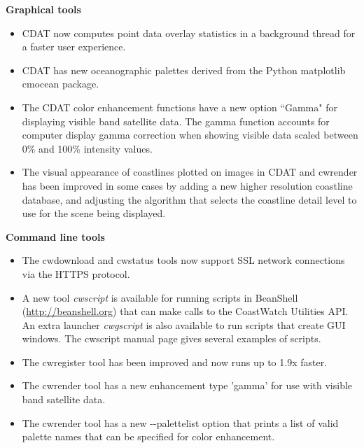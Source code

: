 \hspace{0.4cm} {\bf Graphical tools}
\begin{itemize}

  \item CDAT now computes point data overlay statistics in a background thread
  for a faster user experience.

  \item CDAT has new oceanographic palettes derived from the Python matplotlib
  cmocean package.

  \item The CDAT color enhancement functions have a new option ``Gamma" for
  displaying visible band satellite data.  The gamma function accounts for
  computer display gamma correction when showing visible data scaled between
  0\% and 100\% intensity values.

  \item The visual appearance of coastlines plotted on images in CDAT and
  cwrender has been improved in some cases by adding a new higher
  resolution coastline database, and adjusting the algorithm that selects
  the coastline detail level to use for the scene being displayed.

\end{itemize}

\hspace{0.4cm} {\bf Command line tools}
\begin{itemize}

    \item The cwdownload and cwstatus tools now support SSL network connections
    via the HTTPS protocol.

    \item A new tool {\em cwscript} is available for running scripts in
    BeanShell (\url{http://beanshell.org}) that can make calls to the
    CoastWatch Utilities API.  An extra launcher {\em cwgscript}
    is also available to run scripts that create GUI windows.  The cwscript
    manual page gives several examples of scripts.

    \item The cwregister tool has been improved and now runs up to 1.9x faster.

    \item The cwrender tool has a new enhancement type 'gamma' for use with
    visible band satellite data.

    \item The cwrender tool has a new -{-}palettelist option that prints a list
    of valid palette names that can be specified for color enhancement.

\end{itemize}

